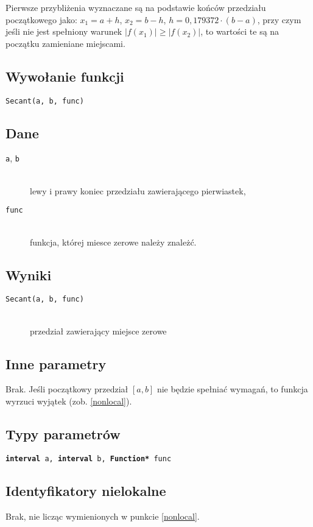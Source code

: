\documentclass[12pt]{article}
\begin{document}
			Pierwsze przybliżenia wyznaczane są na podstawie końców przedziału początkowego jako:
			$x_1 = a + h$, $x_2 = b - h$, $h = 0,179372 \cdot (b-a)$, przy czym jeśli nie jest spełniony warunek
			$|f(x_1)| \geq |f(x_2)|$, to wartości te są na początku zamieniane miejscami.

		\subsection{Wywołanie funkcji}
      \texttt{Secant(a, b, func)}

		\subsection{Dane}
      \begin{description}
        \item[\texttt{a}, \texttt{b}] \hfill\\ lewy i prawy koniec przedziału zawierającego pierwiastek,
        \item[\texttt{func}] \hfill\\ funkcja, której miesce zerowe należy znależć.
      \end{description}

		\subsection{Wyniki}
      \begin{description}
        \item[\texttt{Secant(a, b, func)}] \hfill\\
          przedział zawierający miejsce zerowe
      \end{description}

		\subsection{Inne parametry}
      Brak. Jeśli początkowy przedział $[a, b]$ nie będzie spełniać wymagań, to funkcja wyrzuci wyjątek (zob. \ref{nonlocal}).

		\subsection{Typy parametrów}
      \texttt{\textbf{interval} a, \textbf{interval} b, \textbf{Function*} func}

		\subsection{Identyfikatory nielokalne}
      Brak, nie licząc wymienionych w punkcie \ref{nonlocal}.
\end{document}
